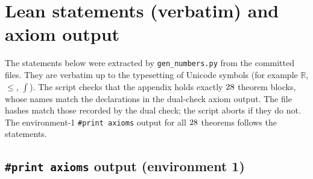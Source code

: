 \documentclass[11pt]{article}
\begin{document}
\appendix
\section{Lean statements (verbatim) and axiom output}\label{app:lean}
The statements below were extracted by \texttt{gen\_numbers.py} from the committed files. They are verbatim up to the
typesetting of Unicode symbols (for example $\mathbb{R}$, $\le$, $\int$). The script checks that the appendix holds exactly
$28$ theorem blocks, whose names match the declarations in the dual-check axiom output. The file hashes match those recorded by the dual
check; the script aborts if they do not. The environment-1 \texttt{\#print axioms} output for all $28$ theorems follows the statements.

\subsection*{\texttt{\#print axioms} output (environment 1)}

\end{document}
